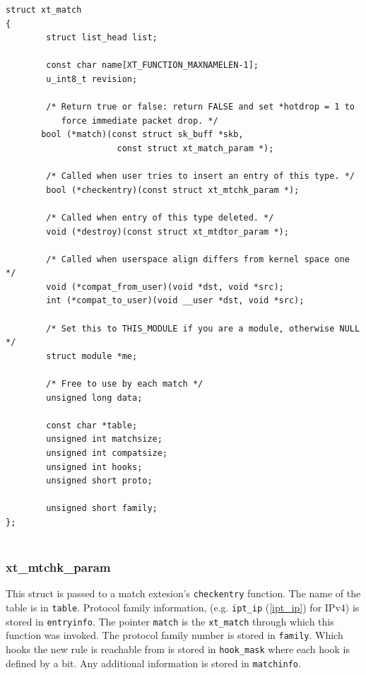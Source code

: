 \documentclass[a4paper,10pt]{article}
\newcommand{\code}[1]{\texttt{{#1}}}
\begin{document}
\begin{lstlisting}
struct xt_match
{
        struct list_head list;

        const char name[XT_FUNCTION_MAXNAMELEN-1];
        u_int8_t revision;

        /* Return true or false: return FALSE and set *hotdrop = 1 to                                                                                       
           force immediate packet drop. */
       bool (*match)(const struct sk_buff *skb,
                      const struct xt_match_param *);

        /* Called when user tries to insert an entry of this type. */
        bool (*checkentry)(const struct xt_mtchk_param *);

        /* Called when entry of this type deleted. */
        void (*destroy)(const struct xt_mtdtor_param *);

        /* Called when userspace align differs from kernel space one */
        void (*compat_from_user)(void *dst, void *src);
        int (*compat_to_user)(void __user *dst, void *src);

        /* Set this to THIS_MODULE if you are a module, otherwise NULL */
        struct module *me;

        /* Free to use by each match */
        unsigned long data;

        const char *table;
        unsigned int matchsize;
        unsigned int compatsize;
        unsigned int hooks;
        unsigned short proto;

        unsigned short family;
};
        
\end{lstlisting}

\subsubsection{xt\_mtchk\_param}\label{xt_mtchk_param}

This struct is passed to a match extesion's \code{checkentry}
function. The name of the table is in \code{table}. Protocol family
information, (e.g. \code{ipt\_ip} (\ref{ipt_ip}) for IPv4) is stored
in \code{entryinfo}.  The pointer \code{match} is the \code{xt\_match}
through which this function was invoked. The protocol family number is
stored in \code{family}.  Which hooks the new rule is reachable from
is stored in \code{hook\_mask} where each hook is defined by a
bit. Any additional information is stored in \code{matchinfo}.
\end{document}
